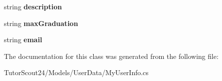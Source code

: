 \begin{DoxyCompactItemize}
\item 
\mbox{\label{class_tutor_scout24_1_1_models_1_1_user_data_1_1_my_user_info_af7969869bafd8f5f089ecd3825c46b43}} 
string {\bfseries description}
\item 
\mbox{\label{class_tutor_scout24_1_1_models_1_1_user_data_1_1_my_user_info_a9d7c9c63c3325b30e4a4ef288b744e4a}} 
string {\bfseries max\+Graduation}
\item 
\mbox{\label{class_tutor_scout24_1_1_models_1_1_user_data_1_1_my_user_info_a9013c98ebebe7da136d9f10066255d81}} 
string {\bfseries email}
\end{DoxyCompactItemize}


The documentation for this class was generated from the following file\+:\begin{DoxyCompactItemize}
\item 
Tutor\+Scout24/\+Models/\+User\+Data/My\+User\+Info.\+cs\end{DoxyCompactItemize}
